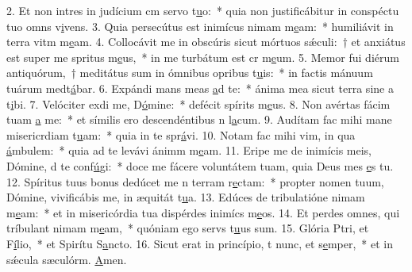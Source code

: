 2. Et non intres in judícium cm servo t\uline{u}o:~* quia non justificábitur in conspéctu tuo omns v\uline{i}vens.
3. Quia persecútus est inimícus nimam m\uline{e}am:~* humiliávit in terra vitm m\uline{e}am.
4. Collocávit me in obscúris sicut mórtuos sǽculi:~† et anxiátus est super me spritus m\uline{e}us,~* in me turbátum est cr m\uline{e}um.
5. Memor fui diérum antiquórum,~† meditátus sum in ómnibus opribus t\uline{u}is:~* in factis mánuum tuárum medt\uline{á}bar.
6. Expándi mans meas \uline{a}d te:~* ánima mea sicut terra sine a t\uline{i}bi.
7. Velóciter exdi me, D\uline{ó}mine:~* defécit spírits m\uline{e}us.
8. Non avértas fácim tuam \uline{a} me:~* et símilis ero descendéntibus n l\uline{a}cum.
9. Audítam fac mihi mane misericrdiam t\uline{u}am:~* quia in te spr\uline{á}vi.
10. Notam fac mihi vim, in qua \uline{á}mbulem:~* quia ad te levávi ánimm m\uline{e}am.
11. Eripe me de inimícis meis, Dómine, d te conf\uline{ú}gi:~* doce me fácere voluntátem tuam, quia Deus mes \uline{e}s tu.
12. Spíritus tuus bonus dedúcet me n terram r\uline{e}ctam:~* propter nomen tuum, Dómine, vivificábis me, in æquitát t\uline{u}a.
13. Edúces de tribulatióne nimam m\uline{e}am:~* et in misericórdia tua dispérdes inimícs m\uline{e}os.
14. Et perdes omnes, qui tríbulant nimam m\uline{e}am,~* quóniam ego servs t\uline{u}us sum.
15. Glória Ptri, et F\uline{í}lio,~* et Spirítu S\uline{a}ncto.
16. Sicut erat in princípio, t nunc, et s\uline{e}mper,~* et in sǽcula sæculórm. \uline{A}men.

